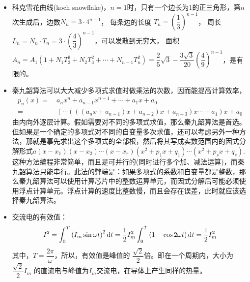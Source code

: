 \begin{itemize}[leftmargin=\inteval{\myitemleftmargin}pt,itemsep=
   \inteval{\myitemitempsep}pt,topsep=\inteval{\myitemtopsep}pt]
\item 科克雪花曲线(koch snowflake)，$ n=1 $时，只有一个边长为1的正三角形，第$ n $次生成后，边数$ N_n=3 \cdot 4^{n-1} $，
每条边的长度 $ T_n=\left(\dfrac{1}{3} \right)^{n-1}  $，
周长$ L_n=N_n \cdot T_n=3\cdot \left( \dfrac{4}{3}\right)^{n-1}  $，可以发散到无穷大，
面积$ A_n =A_1(1+N_1 T_2^2+N_2T_3^2+\cdots +N_{n-1}T_n^2)
=\dfrac{2}{5}\sqrt{3}-\dfrac{3\sqrt{3}}{20}\left(\dfrac{4}{9} \right)^{n-1}  $，是有限的。

\item 秦九韶算法可以大大减少多项式求值时做乘法的次数，因而能提高计算效率，
\begin{align*}
    p_n(x) =&\ a_nx^n+a_{n-1}x^{n-1}+\cdots + a_1x+a_0 \\
    =&\ (\cdots (((a_nx+a_{n-1})x+a_{n-2})x+a_{n-3})x\cdots +a_1)x+a_0
\end{align*}	
由内向外逐层计算。假如需要对不同的多项式求值，那么秦九韶算法是首选。但如果是一个确定的多项式对不同的自变量多次求值，还可以考虑另外一种方法，那就是事先求出这个多项式的全部根，然后将其写成实数范围内的因式分解形式$ a(x-x_1)(x-x_2)\cdots (x-x_r)(x^2+p_1x+q_1)\cdots(x^2+p_sx+q_s) $. 这种方法编程非常简单，而且是可并行的(同时进行多个加、减法运算)，而秦九韶算法只能串行。此法的弊端是：如果多项式的系数和自变量都是整数，那么秦九韶算法可以使用计算芯片中的整数运算单元，而因式分解后可能必须使用浮点计算单元。浮点计算的速度比整数慢，而且会存在误差，此时就应该选择秦九韶算法。

\item 交流电的有效值：
\begin{gather*}
I^2=\int_{0}^{T}\left( I_m\sin \omega t\right)^2 \mathrm{d} t
=\dfrac{1}{2}I_m^2 \int_{0}^{T}\left( 1-\cos 2\omega t\right) \mathrm{d} t
=\dfrac{1}{2}I_m^2
\end{gather*}
其中，$ T=\dfrac{2\pi}{\omega} $，所以，有效值是峰值的
$ \dfrac{\sqrt{2}}{2} $倍。即在一个周期内，大小为$ \dfrac{\sqrt{2}}{2}I_m $
的直流电与峰值为$ I_m $交流电，在导体上产生同样的热量。


\end{itemize}
